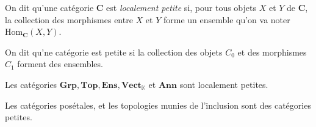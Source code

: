 \begin{defn}
  On dit qu'une catégorie $\mathbf{C}$ est \textit{localement petite} si, pour tous objets $X$ et $Y$ de $\mathbf{C}$, la collection des morphismes entre $X$ et $Y$ forme un ensemble qu'on va noter $\mathrm{Hom}_\mathbf{C}(X,Y)$.

  On dit qu'ne catégorie est petite si la collection des objets $C_0$ et des morphismes $C_1$ forment des ensembles.
\end{defn}

\begin{exm}
  Les catégories $\mathbf{Grp}, \mathbf{Top}, \mathbf{Ens}, \mathbf{Vect}_\mathds{K}$ et $\mathbf{Ann}$ sont localement petites.

  Les catégories posétales, et les topologies munies de l'inclusion sont des catégories petites.
\end{exm}
